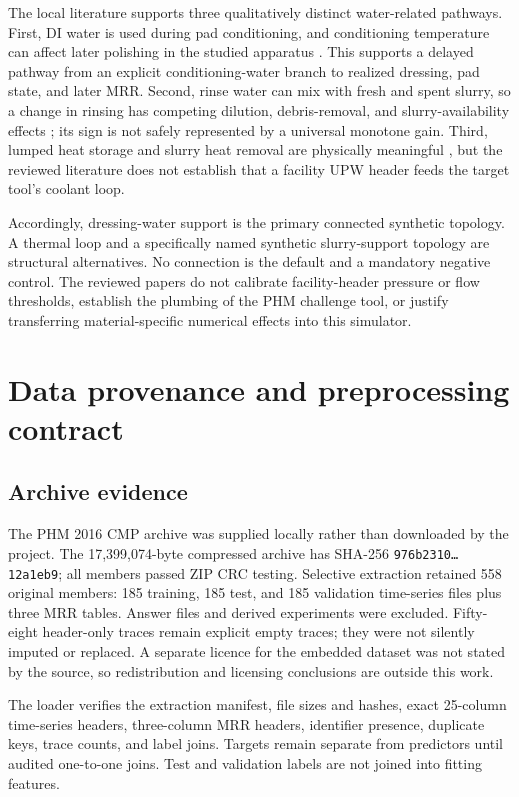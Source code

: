 \documentclass[10pt,twocolumn]{article}
\begin{document}
The local literature supports three qualitatively distinct water-related
pathways. First, DI water is used during pad conditioning, and conditioning
temperature can affect later polishing in the studied apparatus
\cite{kim2005,mudhivarthi2006}. This supports a delayed pathway from an
explicit conditioning-water branch to realized dressing, pad state, and later
MRR. Second, rinse water can mix with fresh and spent slurry, so a change in
rinsing has competing dilution, debris-removal, and slurry-availability effects
\cite{bahr2017}; its sign is not safely represented by a universal monotone
gain. Third, lumped heat storage and slurry heat removal are physically
meaningful \cite{white2003}, but the reviewed literature does not establish
that a facility UPW header feeds the target tool's coolant loop.

Accordingly, dressing-water support is the primary connected synthetic
topology. A thermal loop and a specifically named synthetic slurry-support
topology are structural alternatives. No connection is the default and a
mandatory negative control. The reviewed papers do not calibrate
facility-header pressure or flow thresholds, establish the plumbing of the
PHM challenge tool, or justify transferring material-specific numerical
effects into this simulator.

\section{Data provenance and preprocessing contract}

\subsection{Archive evidence}

The PHM 2016 CMP archive \cite{phm2016cmp} was supplied locally rather than
downloaded by the project. The 17,399,074-byte compressed archive has SHA-256
\texttt{976b2310\ldots 12a1eb9}; all members passed ZIP CRC testing. Selective
extraction retained 558 original members: 185 training, 185 test, and 185
validation time-series files plus three MRR tables. Answer files and derived
experiments were excluded. Fifty-eight header-only traces remain explicit
empty traces; they were not silently imputed or replaced. A separate licence
for the embedded dataset was not stated by the source, so redistribution and
licensing conclusions are outside this work.

The loader verifies the extraction manifest, file sizes and hashes, exact
25-column time-series headers, three-column MRR headers, identifier presence,
duplicate keys, trace counts, and label joins. Targets remain separate from
predictors until audited one-to-one joins. Test and validation labels are not
joined into fitting features.
\end{document}
